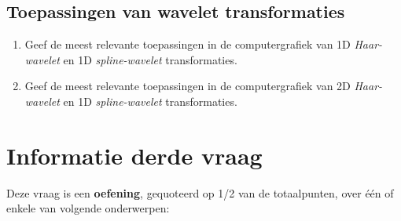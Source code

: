 \documentclass{report}
\begin{document}
	\section{Toepassingen van wavelet transformaties }
	\begin{enumerate}
		\item Geef de meest relevante toepassingen in de computergrafiek van 1D \textit{Haar-wavelet} en 1D \textit{spline-wavelet} transformaties. 
		
		\item 	Geef de meest relevante toepassingen in de computergrafiek van 2D \textit{Haar-wavelet} en 1D \textit{spline-wavelet} transformaties. 
	\end{enumerate}
	
	\chapter{Informatie derde vraag}
	Deze vraag is een \textbf{oefening}, gequoteerd op 1/2 van de totaalpunten, over één of enkele van volgende onderwerpen:
\end{document}

